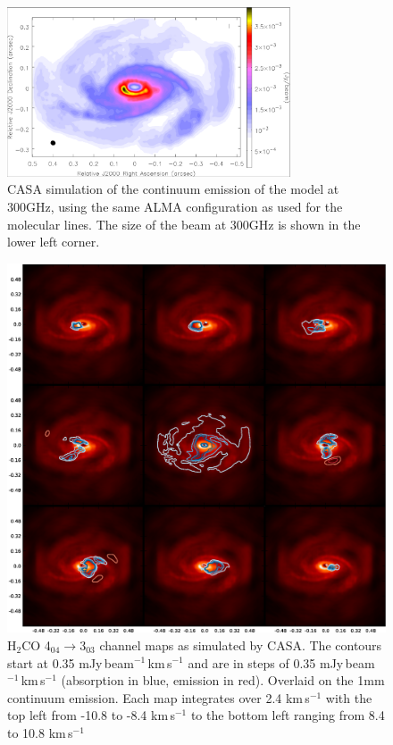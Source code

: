 \documentclass[useAMS,usenatbib]{mn2e}
\begin{document}
\begin{figure}
 \includegraphics[width=84mm]{Figures/sim/casa_cont_300GHz_invert.eps}

 \caption{CASA simulation of the continuum emission of the model at 300GHz, using the same ALMA configuration as used for the molecular lines. The size of the beam at 300GHz is shown in the lower left corner.}
 \label{continuum}
\end{figure}

\begin{figure}
 \includegraphics[width=168mm]{Figures/sim/channel_map-1.eps} 
 \caption{H$_2$CO 4$_{04}\rightarrow$3$_{03}$ channel maps as simulated by CASA. The contours start at 0.35 mJy$\,$beam$^{-1}\,$km$\,$s$^{-1}$  and are in steps of 0.35 mJy$\,$beam$^{-1}\,$km$\,$s$^{-1}$ (absorption in blue, emission in red). Overlaid on the 1mm continuum emission. Each map integrates over 2.4 km$\,$s$^{-1}$ with the top left from -10.8 to -8.4 km$\,$s$^{-1}$ to the bottom left ranging from 8.4 to 10.8 km$\,$s$^{-1}$}
 \label{h2co_chanmap}
\end{figure}
\end{document}
